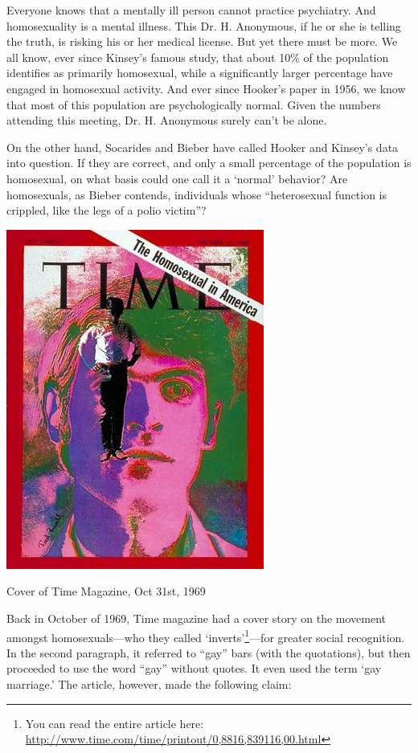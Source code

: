 \begin{refsection}
Everyone knows that a mentally ill person cannot practice psychiatry. And homosexuality is a mental illness. This Dr. H. Anonymous, if he or she is telling the truth, is risking his or her medical license. But yet there must be more. We all know, ever since Kinsey's famous study, that about 10\% of the population identifies as primarily homosexual, while a significantly larger percentage have engaged in homosexual activity. And ever since Hooker's paper in 1956, we know that most of this population are psychologically normal. Given the numbers attending this meeting, Dr. H. Anonymous surely can't be alone.

On the other hand, Socarides and Bieber have called Hooker and Kinsey's data into question. If they are correct, and only a small percentage of the population is homosexual, on what basis could one call it a `normal' behavior? Are homosexuals, as Bieber contends, individuals whose “heterosexual function is crippled, like the legs of a polio victim”?
\begin{marginfigure}
 \begin{center}

     \includegraphics{../images/TimeCover.jpg}
\end{center}
 \caption{Cover of Time Magazine, Oct 31st, 1969}
\label{fig: time1969}
\end{marginfigure}


Back in October of 1969, Time magazine had a cover story on the movement amongst homosexuals---who they called `inverts'\footnote{You can read the entire article here: \url{http://www.time.com/time/printout/0,8816,839116,00.html}}---for greater social recognition. In the second paragraph, it referred to “gay” bars (with the quotations), but then proceeded to use the word “gay” without quotes. It even used the term `gay marriage.' The article, however, made the following claim:


\end{refsection}
